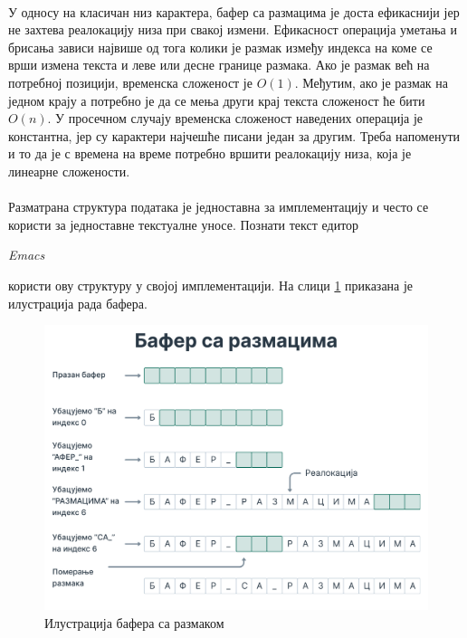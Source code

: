 \documentclass[12pt,oneside]{memoir}
\begin{document}
\paragraph{}
У односу на класичан низ карактера, бафер са размацима је доста 
ефикаснији јер не захтева реалокацију низа при свакој измени. Ефикасност операција уметања и 
брисања зависи највише од тога колики је размак између индекса на коме се  
врши измена текста и леве или десне границе размака. Ако је размак већ на потребној позицији, 
временска сложеност је \(O(1)\). Међутим, ако је размак на једном крају а потребно је да 
се мења други крај текста сложеност ће бити \(O(n)\). У просечном случају временска 
сложеност наведених операција је константна, јер су карактери најчешће писани један за другим. 
Треба напоменути и то да је с времена на време потребно вршити реалокацију низа, 
која је линеарне сложености.

\paragraph{}
Разматрана структура података је једноставна за имплементацију и често се користи за једноставне
текстуалне уносе. Познати текст едитор \begin{latinica}\textit{Emacs}\end{latinica} \cite{Emacs} 
користи ову структуру у својој имплементацији. На слици \ref{fig:gap_buffer} приказана је 
илустрација рада бафера.

\begin{figure}[!ht]
  \centering
  \includegraphics[width=1.1\textwidth]{images/Bafer_2.png}
  \caption{Илустрација бафера са размаком}
  \label{fig:gap_buffer}
\end{figure}
\end{document}
